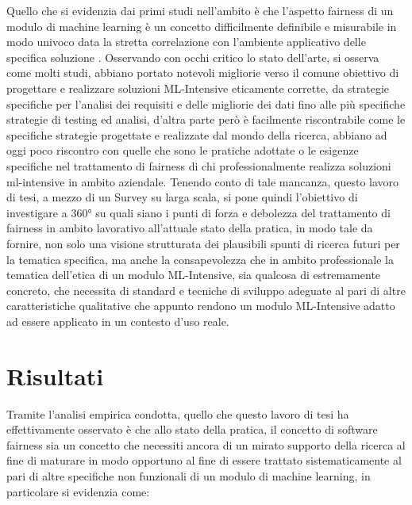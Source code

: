 Quello che si evidenzia dai primi studi nell'ambito è che l'aspetto fairness di un modulo di machine learning è un concetto difficilmente definibile e misurabile in modo univoco data la stretta correlazione con l'ambiente applicativo delle specifica soluzione \cite{FairnessDefinitionExplained}. Osservando con occhi critico lo stato dell'arte, si osserva come molti studi, abbiano portato notevoli migliorie verso il comune obiettivo di progettare e realizzare soluzioni ML-Intensive eticamente corrette, da strategie specifiche per l'analisi dei requisiti e delle migliorie dei dati fino alle più specifiche strategie di testing ed analisi, d'altra parte però è facilmente riscontrabile come le specifiche strategie progettate e realizzate dal mondo della ricerca, abbiano ad oggi poco riscontro con quelle che sono le pratiche adottate o le esigenze specifiche nel trattamento di fairness di chi professionalmente realizza soluzioni ml-intensive in ambito aziendale. Tenendo conto di tale mancanza, questo lavoro di tesi, a mezzo di un Survey su larga scala, si pone quindi l'obiettivo di investigare a 360° su quali siano i punti di forza e debolezza del trattamento di fairness in ambito lavorativo all'attuale stato della pratica, in modo tale da fornire, non solo una visione strutturata dei plausibili spunti di ricerca futuri per la tematica specifica, ma anche la consapevolezza che in ambito professionale la tematica dell'etica di un modulo ML-Intensive, sia qualcosa di estremamente concreto, che necessita di standard e tecniche di sviluppo adeguate al pari di altre caratteristiche qualitative che appunto rendono un modulo ML-Intensive adatto ad essere applicato in un contesto d'uso reale.

\section{Risultati}
Tramite l'analisi empirica condotta, quello che questo lavoro di tesi ha effettivamente osservato è che allo stato della pratica, il concetto di software fairness sia un concetto che necessiti ancora di un mirato supporto della ricerca al fine di maturare in modo opportuno al fine di essere trattato sistematicamente al pari di altre specifiche non funzionali di un modulo di machine learning, in particolare si evidenzia come:

